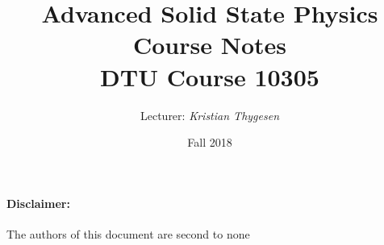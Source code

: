 \documentclass[a4paper,11pt]{article}
\title{Advanced Solid State Physics Course Notes \\ DTU Course 10305}
\author{Lecturer: \emph{Kristian Thygesen}}
\date{Fall 2018}
\begin{document}
\maketitle
\paragraph{Disclaimer:} The authors of this document are second to none








\end{document}
